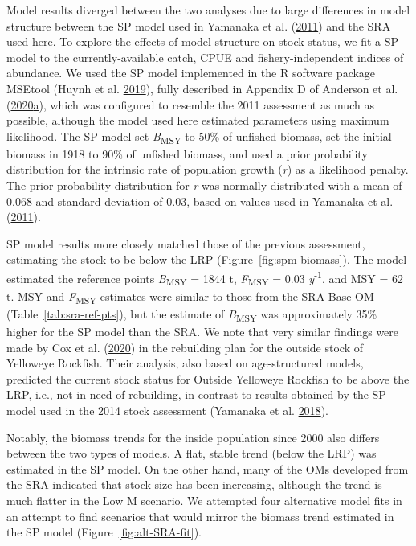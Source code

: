 \documentclass[11pt]{book}
\begin{document}
Model results diverged between the two analyses due to large differences in model structure between the SP model used in Yamanaka et al. (\protect\hyperlink{ref-yamanaka2011}{2011}) and the SRA used here. To explore the effects of model structure on stock status, we fit a SP model to the currently-available catch, CPUE and fishery-independent indices of abundance. We used the SP model implemented in the R software package MSEtool (Huynh et al. \protect\hyperlink{ref-huynh_msetool_2019}{2019}), fully described in Appendix D of Anderson et al. (\protect\hyperlink{ref-anderson2020gfmp}{2020}\protect\hyperlink{ref-anderson2020gfmp}{a}), which was configured to resemble the 2011 assessment as much as possible, although the model used here estimated parameters using maximum likelihood. The SP model set \emph{B}\textsubscript{MSY} to 50\% of unfished biomass, set the initial biomass in 1918 to 90\% of unfished biomass, and used a prior probability distribution for the intrinsic rate of population growth (\emph{r}) as a likelihood penalty. The prior probability distribution for \emph{r} was normally distributed with a mean of 0.068 and standard deviation of 0.03, based on values used in Yamanaka et al. (\protect\hyperlink{ref-yamanaka2011}{2011}).

SP model results more closely matched those of the previous assessment, estimating the stock to be below the LRP (Figure~\ref{fig:spm-biomass}). The model estimated the reference points \emph{B}\textsubscript{MSY} = 1844 t, \emph{F}\textsubscript{MSY} = 0.03 \emph{y}\textsuperscript{-1}, and MSY = 62 t. MSY and \emph{F}\textsubscript{MSY} estimates were similar to those from the SRA Base OM (Table~\ref{tab:sra-ref-pts}), but the estimate of \emph{B}\textsubscript{MSY} was approximately 35\% higher for the SP model than the SRA. We note that very similar findings were made by Cox et al. (\protect\hyperlink{ref-cox2020}{2020}) in the rebuilding plan for the outside stock of Yelloweye Rockfish. Their analysis, also based on age-structured models, predicted the current stock status for Outside Yelloweye Rockfish to be above the LRP, i.e., not in need of rebuilding, in contrast to results obtained by the SP model used in the 2014 stock assessment (Yamanaka et al. \protect\hyperlink{ref-yamanaka2018yelloweyeoutside}{2018}).

Notably, the biomass trends for the inside population since 2000 also differs between the two types of models. A flat, stable trend (below the LRP) was estimated in the SP model. On the other hand, many of the OMs developed from the SRA indicated that stock size has been increasing, although the trend is much flatter in the Low M scenario. We attempted four alternative model fits in an attempt to find scenarios that would mirror the biomass trend estimated in the SP model (Figure~\ref{fig:alt-SRA-fit}).
\end{document}

